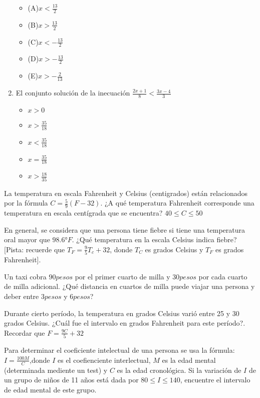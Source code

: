 \documentclass[]{book}
\theoremstyle{definition}
\theoremstyle{definition}
\theoremstyle{definition}
\theoremstyle{remark}
\begin{document}
\begin{enumerate}
\begin{itemize}
	\item (A)$x<\frac{13}{2}$
	\item (B)$x>\frac{13}{2}$
	\item (C)$x<-\frac{13}{2}$
	\item (D)$x>-\frac{13}{2}$
	\item (E)$x>-\frac{2}{13}$
\end{itemize}
  \item El conjunto solución de la inecuación $\frac{2x+1}{8}<\frac{3x-4}{3}$
  
\begin{itemize}
	\item $x>0$
	\item $x>\frac{35}{18}$
	\item $x<\frac{35}{18}$
	\item $x=\frac{35}{18}$
	\item $x>\frac{18}{35}$
\end{itemize}
\end{enumerate}

La temperatura en escala Fahrenheit y Celsius (centigrados) están relacionados por la fórmula \(C=\frac{5}{9}(F-32)\). ¿A qué temperatura Fahrenheit corresponde una temperatura en escala centígrada que se encuentra? \(40\leq C \leq 50\)

En general, se considera que una persona tiene
fiebre si tiene una temperatura oral mayor que \(98.6°F\).
¿Qué temperatura en la escala Celsius indica fiebre? {[}Pista: recuerde que \(T_{F}=\frac{9}{5}T_{c}+32\), donde \(T_{C}\) es grados Celsius y \(T_{F}\) es
grados Fahrenheit{]}.

Un taxi cobra \(90 pesos\) por el primer cuarto de
milla y \(30 pesos\) por cada cuarto de milla adicional. ¿Qué distancia en cuartos de milla puede viajar una persona y deber
entre \(3 pesos\) y \(6 pesos\)?

Durante cierto período, la temperatura en grados Celsius varió entre 25 y 30 grados Celsius. ¿Cuál fue el intervalo en grados Fahrenheit para este período?. Recordar que \(F=\frac{9C}{5}+32\)

Para determinar el coeficiente intelectual de una persona se usa la fórmula: \(I=\frac{100M}{C}\),\break donde \(I\) es el coefienciente interlectual, \(M\) es la edad mental (determinada mediente un test) y \(C\) es la edad cronológica. Si la variación de \(I\) de un grupo de niños de 11 años está dada por \(80\leq I \leq 140\), encuentre el intervalo de edad mental de este grupo.
\end{document}
